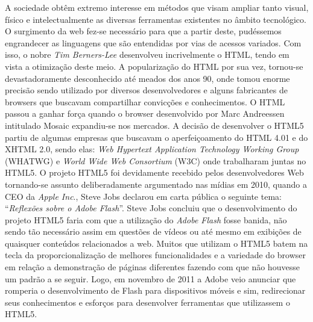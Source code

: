 \documentclass[12pt,a4paper]{article}
\begin{document}
A sociedade obtêm extremo interesse em métodos que visam ampliar tanto visual, físico e intelectualmente as diversas ferramentas existentes no âmbito tecnológico. O surgimento da web fez-se necessário para que a partir deste, pudéssemos engrandecer as linguagens que são entendidas por vias de acessos variados. Com isso, o nobre \textit{Tim Berners-Lee} desenvolveu incrivelmente o HTML, tendo em vista a otimização deste meio. 
	A popularização do HTML por sua vez, tornou-se devastadoramente desconhecido até meados dos anos 90, onde tomou enorme precisão sendo utilizado por diversos desenvolvedores e alguns fabricantes de browsers que buscavam compartilhar convicções e conhecimentos. O HTML passou a ganhar força quando o browser desenvolvido por Marc Andreessen intitulado Mosaic expandiu-se nos mercados. 
	A decisão de desenvolver o HTML5 partiu de algumas empresas que buscavam o aperfeiçoamento do HTML 4.01 e do XHTML 2.0, sendo elas: \textit{Web Hypertext Application Technology Working Group} (WHATWG) e \textit{World Wide Web Consortium} (W3C) onde trabalharam juntas no HTML5. O projeto HTML5 foi devidamente recebido pelos desenvolvedores Web tornando-se assunto deliberadamente argumentado nas mídias em 2010, quando a CEO da \textit{Apple Inc}., Steve Jobs declarou em carta pública o seguinte tema: “\textit{Reflexões sobre o Adobe Flash}”. Steve Jobs concluiu que o desenvolvimento do projeto HTML5 faria com que a utilização do \textit{Adobe Flash} fosse banida, não sendo tão necessário assim em questões de vídeos ou até mesmo em exibições de quaisquer conteúdos relacionados a web. 
	Muitos que utilizam o HTML5 batem na tecla da proporcionalização de melhores funcionalidades e a variedade do browser em relação a demonstração de páginas diferentes fazendo com que não houvesse um padrão a se seguir. Logo, em novembro de 2011 a Adobe veio anunciar que romperia o desenvolvimento de Flash para dispositivos móveis e sim, redirecionar seus conhecimentos e esforços para desenvolver ferramentas que utilizassem o HTML5. 
	
\end{document}
